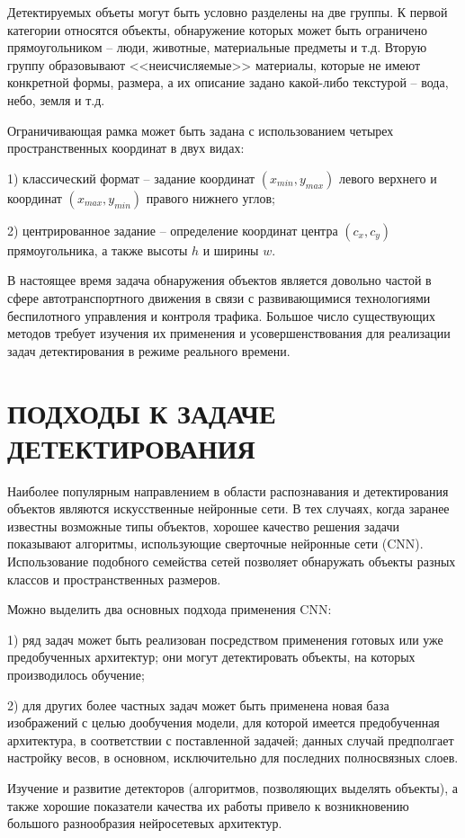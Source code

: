 \documentclass[14pt,a4paper]{extarticle}
\begin{document}
Детектируемых объеты могут быть условно разделены на две группы. К первой категории относятся объекты, обнаружение которых может быть ограничено прямоугольником -- люди, животные, материальные предметы и т.д. Вторую группу образовывают <<неисчисляемые>> материалы, которые не имеют конкретной формы, размера, а их описание задано какой-либо текстурой -- вода, небо, земля и т.д.

Ограничивающая рамка может быть задана с использованием четырех пространственных координат в двух видах:

1) классический формат -- задание координат $(x_{min}, y_{max})$ левого верхнего и координат $(x_{max}, y_{min})$ правого нижнего углов;

2) центрированное задание -- определение координат центра $(c_x, c_y)$ прямоугольника, а также высоты $h$ и ширины $w$. 

В настоящее время задача обнаружения объектов является довольно час\-той в сфере автотранспортного движения в связи с развивающимися технологиями беспилотного управления и контроля трафика. Большое число существующих методов требует изучения их применения и усовершенствования для реализации задач детектирования в режиме реального времени. 

\newpage
\section{ПОДХОДЫ К ЗАДАЧЕ ДЕТЕКТИРОВАНИЯ}
Наиболее популярным направлением в области распознавания и детектирования объектов являются искусственные нейронные сети. В тех случаях, когда заранее известны возможные типы объектов, хорошее качество решения задачи показывают алгоритмы, использующие сверточные нейронные сети (CNN). Использование подобного семейства сетей позволяет обнаружать объекты разных классов и пространственных размеров. 

Можно выделить два основных подхода применения CNN:

1) ряд задач может быть реализован посредством применения готовых или уже предобученных архитектур; они могут детектировать объекты, на которых производилось обучение;

2) для других более частных задач может быть применена новая база изображений с целью дообучения модели, для которой имеется предобученная архитектура, в соответствии с поставленной задачей; данных случай предполгает настройку весов, в основном, исключительно для последних полносвязных слоев. 

Изучение и развитие детекторов (алгоритмов, позволяющих выделять объекты), а также хорошие показатели качества их работы привело к возникновению большого разнообразия нейросетевых архитектур. 
\end{document}

